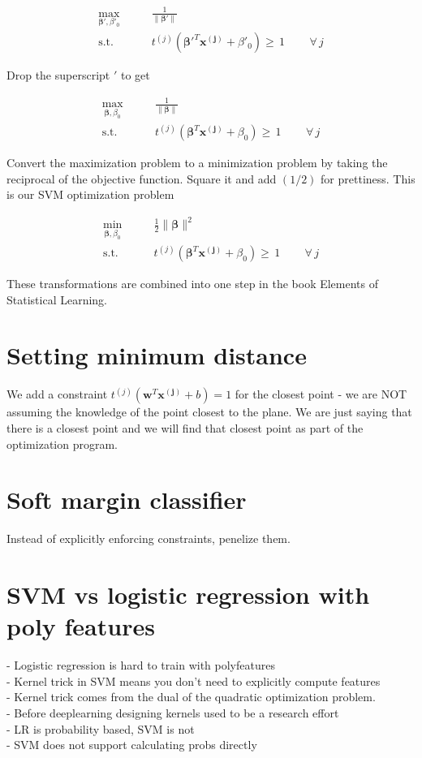 \documentclass{article}
\newcommand{\beq}{\begin{equation}}
\newcommand{\eeq}{\end{equation}}
\begin{document}
\beq
\label{eqn:formulation5}
\begin{aligned}
  \max_{\pmb{\beta}',\beta'_0} &  \qquad \frac{1}{\|\pmb{\beta}'\|} \\
  \textrm{s.t.} & \qquad {t^{(j)}({\pmb{\beta}'}^T{\pmb{x^{(j)}}} + \beta'_0)} \ge\, 1  \, \qquad \forall \,{j}
\end{aligned}
\eeq

Drop the superscript $'$ to get 

\beq
\label{eqn:formulation6}
\begin{aligned}
  \max_{\pmb{\beta},\beta_0} &  \qquad \frac{1}{\|\pmb{\beta}\|} \\
  \textrm{s.t.} & \qquad {t^{(j)}({\pmb{\beta}}^T{\pmb{x^{(j)}}} + \beta_0)} \ge \, 1  \, \qquad \forall \,{j}
\end{aligned}
\eeq

Convert the maximization problem to a minimization problem by taking the reciprocal of the objective function. Square it and add $(1/2)$ for prettiness. This is our SVM optimization problem

\beq
\label{eqn:formulation7}
\begin{aligned}
  \min_{\pmb{\beta},\beta_0} &  \qquad \frac{1}{2}{\|\pmb{\beta}\|^2} \\
  \textrm{s.t.} & \qquad {t^{(j)}({\pmb{\beta}}^T{\pmb{x^{(j)}}} + \beta_0)} \ge \, 1  \, \qquad \forall \,{j}
\end{aligned}
\eeq

These transformations are combined into one step in the book Elements of Statistical Learning.

\section{Setting minimum distance}

We add a constraint $t^{(j)}(\pmb{w}^T\pmb{x^{(j)}}+b)=1$ for the closest point - we are NOT assuming the knowledge of the point closest to the plane. We are just saying that there is a closest point and we will find that closest point as part of the optimization program.

\section{Soft margin classifier}
Instead of explicitly enforcing constraints, penelize them.

\section{SVM vs logistic regression with poly features}
- Logistic regression is hard to train with polyfeatures\\
- Kernel trick in SVM means you don't need to explicitly compute features\\
- Kernel trick comes from the dual of the quadratic optimization problem.\\
- Before deeplearning designing kernels used to be a research effort\\
- LR is probability based, SVM is not\\
- SVM does not support calculating probs directly\\
\end{document}
